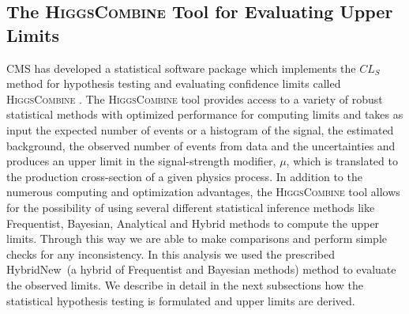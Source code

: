 \subsection{The \textsc{HiggsCombine} Tool for Evaluating Upper Limits}
CMS has developed a statistical software package which implements the $CL_{S}$ method for hypothesis testing and evaluating confidence limits called \textsc{HiggsCombine} \cite{LIMITS}. The  \textsc{HiggsCombine} tool provides access to a variety of robust statistical methods with optimized performance for computing limits and takes as input the expected number of events or a histogram of the signal, the estimated background, the observed number of events from data and the uncertainties and produces an upper limit in the signal-strength modifier, $\mu$, which is translated to the production cross-section of a given physics process. In addition to the numerous computing and optimization advantages, the \textsc{HiggsCombine} tool allows for the possibility of using several different statistical inference methods like Frequentist, Bayesian, Analytical and Hybrid methods to compute the upper limits. Through this way we  are able to make comparisons and perform simple checks for any inconsistency. In this analysis we used the prescribed HybridNew~(a hybrid of Frequentist and Bayesian methods) method to evaluate the observed  limits. We describe in detail in the next subsections how the statistical hypothesis testing is formulated and upper limits are derived.

